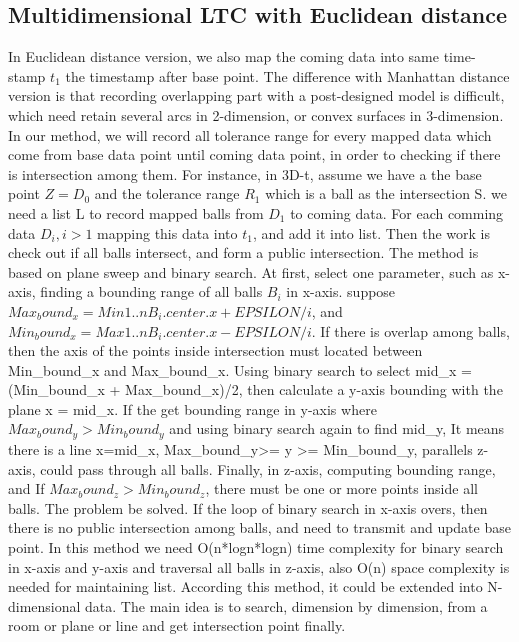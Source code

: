 \documentclass[10pt, conference, compsocconf]{IEEEtran}
\begin{document}
\subsection{Multidimensional LTC with Euclidean distance}
In Euclidean distance version, we also map the coming data into same 
time-stamp $t_1$ the timestamp after base point. The difference with 
Manhattan distance version is that recording overlapping part with
a post-designed model is difficult, which need retain several arcs in 
2-dimension, or convex surfaces in 3-dimension. In our method, we will 
record all tolerance range for every mapped data which come from base 
data point until coming data point, in order to checking if there is 
intersection among them. For instance, in 3D-t, assume we have a the 
base point $Z = D_0$ and the tolerance range $R_1$ which is a ball 
as the intersection S. we need a list L to record mapped balls 
from $D_1$ to coming data. For each comming data $D_i, i>1$ mapping 
this data into $t_1$, and add it into list. Then the work is check out 
if all balls intersect, and form a public intersection. The method is 
based on plane sweep and binary search. At first, select one parameter, 
such as x-axis, finding a bounding range of all balls $B_i$ in x-axis. 
suppose $Max_bound_x = Min{1..n}{B_i.center.x + EPSILON/i}$, and 
$Min_bound_x = Max{1..n}{B_i.center.x - EPSILON/i}$. If there is overlap 
among balls, then the axis of the points inside intersection must located 
between Min_bound_x and Max_bound_x. Using binary search to select 
mid_x = (Min_bound_x + Max_bound_x)/2, then calculate a y-axis bounding 
with the plane x = mid_x. If the get bounding range in y-axis where 
$Max_bound_y > Min_bound_y$ and using binary search again to find mid_y, 
It means there is a line x=mid_x, Max_bound_y>= y >= Min_bound_y, 
parallels z-axis, could pass through all balls. Finally, in z-axis, 
computing bounding range, and If $Max_bound_z > Min_bound_z$, there 
must be one or more points inside all balls. The problem be solved. 
If the loop of binary search in x-axis overs, then there is no public 
intersection among balls, and need to transmit and update base point. 
In this method we need O(n*logn*logn) time complexity for binary search 
in x-axis and y-axis and traversal all balls in z-axis, also O(n) space 
complexity is needed for maintaining list. According this method, 
it could be extended into N-dimensional data. The main idea is to search, 
dimension by dimension, from a room or plane or line and get intersection 
point finally.
\end{document}
